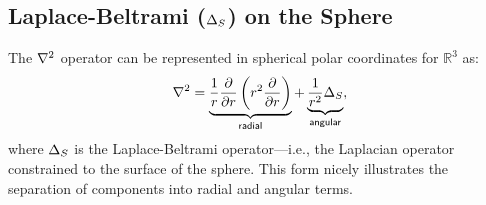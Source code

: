 \documentclass[11pt]{report}
\begin{document}
{%
%
%
%
%


\subsection{Laplace-Beltrami ($\LaplaceBeltrami$) on the Sphere}

The $\Laplacian$ operator can be represented in spherical polar coordinates for $\mathbb{R}^3$ as: 
\begin{align*} 
\nabla^2 = \underbrace{\frac{1}{r} \frac{\partial }{\partial r} \left( r^{2} \frac{\partial }{\partial r}  \right)}_{\mathsf{radial}} + \underbrace{\frac{1}{r^2} \Delta_{S}}_{\mathsf{angular}} , \label{eq:laplacian_in_spherical}
\end{align*}
where $\LaplaceBeltrami$ is the Laplace-Beltrami operator---i.e., the Laplacian operator constrained to the surface of the sphere. This form nicely illustrates the separation of components into radial and angular terms. 

}
\end{document}
